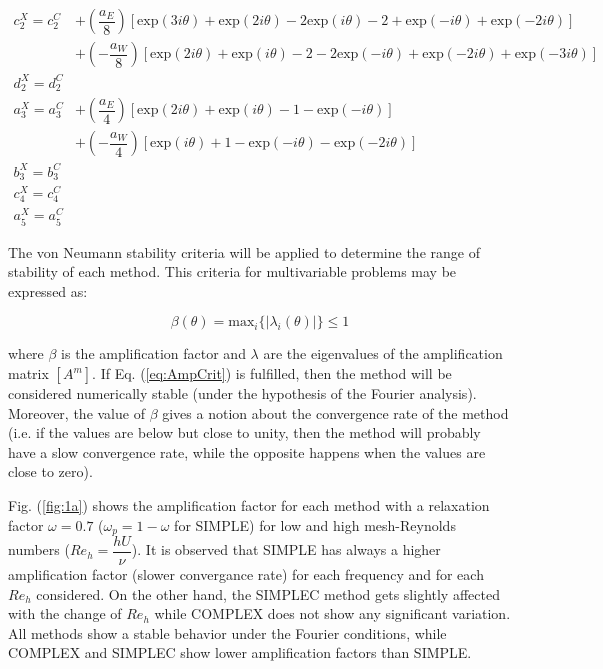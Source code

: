 \documentclass[final,3p,times,11pt,onecolumn]{myElsarticle}
\numberwithin{equation}{section}
\begin{document}
\begin{equation}
\begin{split}
     c^X_2 = c_2^C &+ \left(\dfrac{a_E}{8}\right) \left[\text{exp} (3 i \theta) + \text{exp} (2 i \theta) - 2 \text{exp} (i \theta) - 2 + \text{exp} (-i \theta) + \text{exp} (-2 i \theta)\right] \\
     &+ \left(-\dfrac{a_W}{8}\right) \left[\text{exp} (2 i \theta) + \text{exp} (i \theta) - 2 - 2 \text{exp} (-i \theta) + \text{exp} (-2 i \theta) + \text{exp} (-3 i \theta)\right] \\
     d^X_2 = d^C_2& \\
     a^X_3 = a^C_3 &+ \left(\dfrac{a_E}{4}\right) \left[\text{exp} (2 i \theta) + \text{exp} (i \theta) - 1 - \text{exp} (-i \theta) \right] \\
     &+ \left(-\dfrac{a_W}{4}\right) \left[\text{exp} (i \theta) + 1 - \text{exp} (- i \theta) - \text{exp} (-2 i \theta) \right] \\
     b^X_3 = b_3^C& \\ 
     c^X_4 = c^C_4& \\
     a^X_5 = a^C_5&     
\end{split}
\end{equation}

The von Neumann stability criteria \cite{hirsch} will be applied to determine the range of stability of each method. This criteria for multivariable problems may be expressed as:

\begin{equation}
\beta(\theta) = \text{max}_i \{ |\lambda_i(\theta)| \} \leq 1
\label{eq:AmpCrit}
\end{equation}

\noindent where $\beta$ is the amplification factor and $\lambda$ are the eigenvalues of the amplification matrix $[A^m]$. If Eq. (\ref{eq:AmpCrit}) is fulfilled, then the method will be considered numerically stable (under the hypothesis of the Fourier analysis). Moreover, the value of $\beta$ gives a notion about the convergence rate of the method (i.e. if the values are below but close to unity, then the method will probably have a slow convergence rate, while the opposite happens when the values are close to zero).

Fig. (\ref{fig:1a}) shows the amplification factor for each method with a relaxation factor $\omega=0.7$ ($\omega_p=1-\omega$ for SIMPLE) for low and high mesh-Reynolds numbers ($Re_h = \dfrac{h U}{\nu}$). It is observed that SIMPLE has always a higher amplification factor (slower convergance rate) for each frequency and for each $Re_h$ considered. On the other hand, the SIMPLEC method gets slightly affected with the change of $Re_h$ while COMPLEX does not show any significant variation. All methods show a stable behavior under the Fourier conditions, while COMPLEX and SIMPLEC show lower amplification factors than SIMPLE. 
\end{document}

